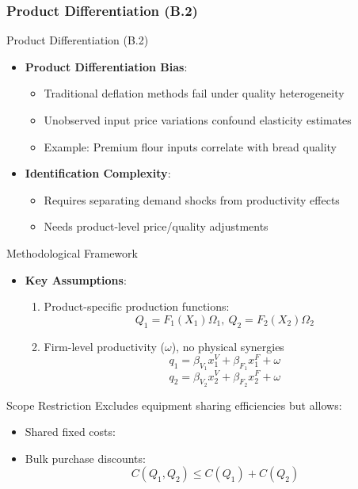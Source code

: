 \documentclass[aspectratio=169]{beamer}  %
\begin{document}
\subsubsection{Product Differentiation (B.2)}
\begin{frame}{Product Differentiation (B.2)}
\begin{itemize}
    \item \textbf{Product Differentiation Bias}:
    \begin{itemize}
        \item Traditional deflation methods fail under quality heterogeneity
        \item Unobserved input price variations confound elasticity estimates
        \item Example: Premium flour inputs correlate with bread quality
    \end{itemize}
    
    \item \textbf{Identification Complexity}:
    \begin{itemize}
        \item Requires separating demand shocks from productivity effects
        \item Needs product-level price/quality adjustments
    \end{itemize}
\end{itemize}
\end{frame}

\begin{frame}{Methodological Framework}
\begin{itemize}
    \item \textbf{Key Assumptions}:
    \begin{enumerate}
        \item Product-specific production functions:
        \[
        Q_1 = F_1(X_1)\Omega_{1},\ Q_2 = F_2(X_2)\Omega_{2}
        \]
        \item Firm-level productivity ($\omega$), no physical synergies
            \[
    q_1 = \beta_{V_1} x_{1}^V + \beta_{F_{1}} x_{1}^F + \omega 
    \]
    \[
    q_2 = \beta_{V_{2}} x_{2}^V + \beta_{F_{2}} x_{2}^F + \omega 
    \]
    \end{enumerate}
\end{itemize}

\begin{alertblock}{Scope Restriction}
Excludes equipment sharing efficiencies but allows:
\begin{itemize}
    \item Shared fixed costs:

    \item Bulk purchase discounts:
    \[
    C(Q_1, Q_2) \leq C(Q_1) + C(Q_2)
    \]
\end{itemize}
\end{alertblock}
\end{frame}
\end{document}
